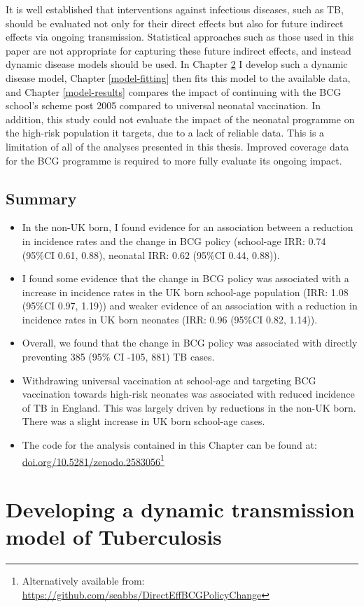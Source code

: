 \documentclass[11pt,twoside]{bristolthesis}
\begin{document}
  It is well established that interventions against infectious diseases, such as TB, should be evaluated not only for their direct effects but also for future indirect effects via ongoing transmission. Statistical approaches such as those used in this paper are not appropriate for capturing these future indirect effects, and instead dynamic disease models should be used. In Chapter \ref{model-development} I develop such a dynamic disease model, Chapter \ref{model-fitting} then fits this model to the available data, and Chapter \ref{model-results} compares the impact of continuing with the BCG school's scheme post 2005 compared to universal neonatal vaccination. In addition, this study could not evaluate the impact of the neonatal programme on the high-risk population it targets, due to a lack of reliable data. This is a limitation of all of the analyses presented in this thesis. Improved coverage data for the BCG programme is required to more fully evaluate its ongoing impact.
  
  \hypertarget{summary-6}{%
  \section{Summary}\label{summary-6}}
  \begin{itemize}
  \item
    In the non-UK born, I found evidence for an association between a reduction in incidence rates and the change in BCG policy (school-age IRR: 0.74 (95\%CI 0.61, 0.88), neonatal IRR: 0.62 (95\%CI 0.44, 0.88)).
  \item
    I found some evidence that the change in BCG policy was associated with a increase in incidence rates in the UK born school-age population (IRR: 1.08 (95\%CI 0.97, 1.19)) and weaker evidence of an association with a reduction in incidence rates in UK born neonates (IRR: 0.96 (95\%CI 0.82, 1.14)).
  \item
    Overall, we found that the change in BCG policy was associated with directly preventing 385 (95\% CI -105, 881) TB cases.
  \item
    Withdrawing universal vaccination at school-age and targeting BCG vaccination towards high-risk neonates was associated with reduced incidence of TB in England. This was largely driven by reductions in the non-UK born. There was a slight increase in UK born school-age cases.
  \item
    The code for the analysis contained in this Chapter can be found at: \url{doi.org/10.5281/zenodo.2583056}\footnote{Alternatively available from: \url{https://github.com/seabbs/DirectEffBCGPolicyChange}}
  \end{itemize}
  \hypertarget{model-development}{%
  \chapter{Developing a dynamic transmission model of Tuberculosis}\label{model-development}}
  
\end{document}
